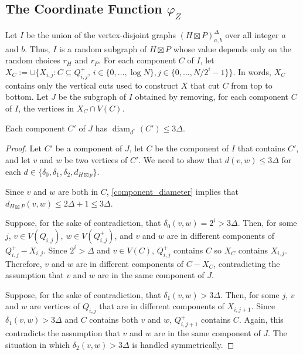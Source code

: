 \documentclass{patmorin}
\renewcommand{\le}{\leqslant}
\DeclareMathOperator{\diam}{diam}
\begin{document}
%
%

\subsection{\boldmath The Coordinate Function $\varphi_Z$}

Let $I$ be the union of the vertex-disjoint graphs $(H\boxtimes P)^\Delta_{a,b}$ over all integer $a$ and $b$.  Thus, $I$ is a random subgraph of $H\boxtimes P$ whose value depends only on the random choices $r_H$ and $r_P$.  For each component $C$ of $I$, let $X_C:=\cup\{X_{i,j}:C\subseteq Q^+_{i,j},\, i\in\{0,\ldots,\log N\}, j\in\{0,\ldots,N/2^i-1\}\}$.  In words, $X_C$ contains only the vertical cuts used to construct $X$ that cut $C$ from top to bottom. Let $J$ be the subgraph of $I$ obtained by removing, for each component $C$ of $I$, the vertices in $X_C\cap V(C)$.

\begin{lem}\label{dstar_component_diameter}
  Each component $C'$ of $J$ has $\diam_{d^*}(C')\le 3\Delta$.
\end{lem}

\begin{proof}
  Let $C'$ be a component of $J$, let $C$ be the component of $I$ that contains $C'$, and let $v$ and $w$ be two vertices of $C'$. We need to show that $d(v,w)\le 3\Delta$ for each $d\in\{\delta_0, \delta_1,\delta_2,d_{H\boxtimes p}\}$.

  Since $v$ and $w$ are both in $C$, \cref{component_diameter} implies that $d_{H\boxtimes P}(v,w)\le 2\Delta+1 \le 3\Delta$.

  Suppose, for the sake of contradiction, that $\delta_0(v,w)=2^i> 3\Delta$. Then, for some $j$, $v\in V(Q_{i,j})$,  $w\in V(Q^+_{i,j})$, and $v$ and $w$ are in different components of $Q^+_{i,j}-X_{i,j}$.  Since $2^i>\Delta$ and $v\in V(C)$, $Q^+_{i,j}$ contains $C$ so $X_C$ contains $X_{i,j}$. Therefore, $v$ and $w$ are in different components of $C-X_C$, contradicting the assumption that $v$ and $w$ are in the same component of $J$.

  Suppose, for the sake of contradiction, that $\delta_1(v,w)>3\Delta$.  Then, for some $j$, $v$ and $w$ are vertices of $Q_{i,j}$ that are in different components of $X_{i,j+1}$. Since $\delta_1(v,w)>3\Delta$ and $C$ contains both $v$ and $w$, $Q^+_{i,j+1}$ contains $C$. Again, this contradicts the assumption that $v$ and $w$ are in the same component of $J$.  The situation in which $\delta_2(v,w)>3\Delta$ is handled symmetrically.
\end{proof}
\end{document}
